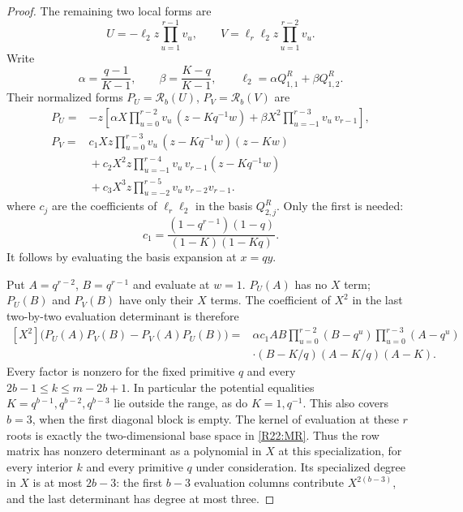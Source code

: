 \documentclass[11pt,a4paper]{article}
\theoremstyle{definition}\newtheorem{definition}{Definition}
\begin{document}
\begin{proof}
The remaining two local forms are
\[
 U=-\ell_2z\prod_{u=1}^{r-1}v_u,\qquad
 V=\ell_r\ell_2z\prod_{u=1}^{r-2}v_u.
\]
Write
\[
 \alpha=\frac{q-1}{K-1},\qquad
 \beta=\frac{K-q}{K-1},\qquad
 \ell_2=\alpha Q^R_{1,1}+\beta Q^R_{1,2}.
\]
Their normalized forms $P_U=\mathcal R_b(U)$,
$P_V=\mathcal R_b(V)$ are
\begin{align*}
 P_U={}&-z\left[
  \alpha X\prod_{u=0}^{r-2}v_u\,(z-Kq^{-1}w)
 +\beta X^2\prod_{u=-1}^{r-3}v_u\,v_{r-1}\right],\\
 P_V={}&c_1Xz\prod_{u=0}^{r-3}v_u\,(z-Kq^{-1}w)(z-Kw)\\
 &{}+c_2X^2z\prod_{u=-1}^{r-4}v_u\,v_{r-1}(z-Kq^{-1}w)\\
 &{}+c_3X^3z\prod_{u=-2}^{r-5}v_u\,v_{r-2}v_{r-1}.
\end{align*}
where $c_j$ are the coefficients of $\ell_r\ell_2$ in the basis
$Q^R_{2,j}$. Only the first is needed:
\begin{equation}\label{R22:c1}
 c_1=\frac{(1-q^{r-1})(1-q)}{(1-K)(1-Kq)}.
\end{equation}
It follows by evaluating the basis expansion at $x=qy$.

Put $A=q^{r-2}$, $B=q^{r-1}$ and evaluate at $w=1$.
$P_U(A)$ has no $X$ term; $P_U(B)$ and $P_V(B)$ have only their
$X$ terms. The coefficient of $X^2$ in the last two-by-two
evaluation determinant is therefore
\begin{equation}\label{R22:last_minor}
 \begin{split}
 [X^2]\big(P_U(A)P_V(B)-P_V(A)P_U(B)\big)
 ={}&\alpha c_1AB
 \prod_{u=0}^{r-2}(B-q^u)
 \prod_{u=0}^{r-3}(A-q^u)\\
 &\cdot(B-K/q)(A-K/q)(A-K).
 \end{split}
\end{equation}
Every factor is nonzero for the fixed primitive $q$ and every
$2b-1\leq k\leq m-2b+1$. In particular the potential equalities
$K=q^{b-1},q^{b-2},q^{b-3}$ lie outside the range, as do $K=1,q^{-1}$.
This also covers $b=3$, when the first diagonal block is empty.
The kernel of evaluation at these $r$ roots is exactly the
two-dimensional base space in \eqref{R22:MR}. Thus the row matrix
has nonzero determinant as a polynomial in $X$ at this specialization,
for every interior $k$ and every primitive $q$ under consideration.
Its specialized degree in $X$ is at most $2b-3$: the first $b-3$
evaluation columns contribute $X^{2(b-3)}$, and the last determinant
has degree at most three.


\end{proof}
\end{document}
